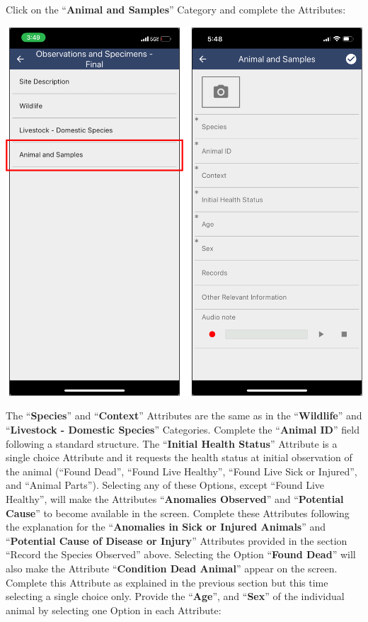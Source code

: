 \documentclass[
  letterpaper,
  DIV=11,
  numbers=noendperiod]{scrreprt}
\begin{document}
Click on the ``\textbf{Animal and Samples}'' Category and complete the
Attributes:

\includegraphics[width=5.83333in,height=\textheight]{Pictures_for_manual/Picture15.png}

The ``\textbf{Species}'' and ``\textbf{Context}'' Attributes are the
same as in the ``\textbf{Wildlife}'' and ``\textbf{Livestock - Domestic
Species}'' Categories. Complete the ``\textbf{Animal ID}'' field
following a standard structure. The ``\textbf{Initial Health Status}''
Attribute is a single choice Attribute and it requests the health status
at initial observation of the animal (``Found Dead'', ``Found Live
Healthy'', ``Found Live Sick or Injured'', and ``Animal Parts'').
Selecting any of these Options, except ``Found Live Healthy'', will make
the Attributes ``\textbf{Anomalies Observed}'' and ``\textbf{Potential
Cause}'' to become available in the screen. Complete these Attributes
following the explanation for the ``\textbf{Anomalies in Sick or Injured
Animals}'' and ``\textbf{Potential Cause of Disease or Injury}''
Attributes provided in the section ``Record the Species Observed''
above. Selecting the Option ``\textbf{Found Dead}'' will also make the
Attribute ``\textbf{Condition Dead Animal}'' appear on the screen.
Complete this Attribute as explained in the previous section but this
time selecting a single choice only. Provide the ``\textbf{Age}'', and
``\textbf{Sex}'' of the individual animal by selecting one Option in
each Attribute:
\end{document}
